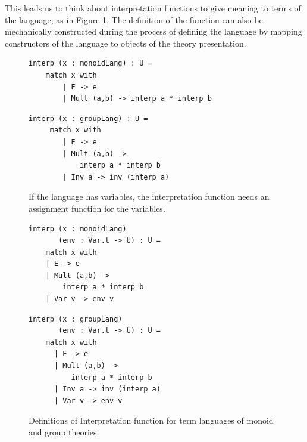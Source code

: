 This leads us to think about interpretation functions to give meaning to terms of the language, as in 
Figure \ref{fig:interp_func}. The definition of the function can also be mechanically constructed 
during 
the process of defining the language by mapping constructors of the language to objects of the theory 
presentation. 
\begin{figure}
	\begin{minipage}[t]{0.5\textwidth}
		\begin{verbatim}
interp (x : monoidLang) : U = 
    match x with
        | E -> e
        | Mult (a,b) -> interp a * interp b
		\end{verbatim}
	\end{minipage}%
	\begin{minipage}[t]{0.5\textwidth}
		\begin{verbatim}
interp (x : groupLang) : U = 
     match x with
        | E -> e
        | Mult (a,b) -> 
            interp a * interp b
        | Inv a -> inv (interp a)
		\end{verbatim}
	\end{minipage}
If the language has variables, the interpretation function needs an assignment function for the variables. \newline 
\begin{minipage}[t]{0.5\textwidth}
	\begin{verbatim}
interp (x : monoidLang) 
       (env : Var.t -> U) : U = 
    match x with
    | E -> e
    | Mult (a,b) -> 
        interp a * interp b
    | Var v -> env v
	\end{verbatim}
\end{minipage}%
\begin{minipage}[t]{0.5\textwidth}
	\begin{verbatim}
interp (x : groupLang) 
       (env : Var.t -> U) : U = 
    match x with
      | E -> e
      | Mult (a,b) -> 
          interp a * interp b
      | Inv a -> inv (interp a)
      | Var v -> env v 
	\end{verbatim}
\end{minipage}%
	\caption{Definitions of Interpretation function for term languages of monoid and group theories.}
	\label{fig:interp_func}
\end{figure}

